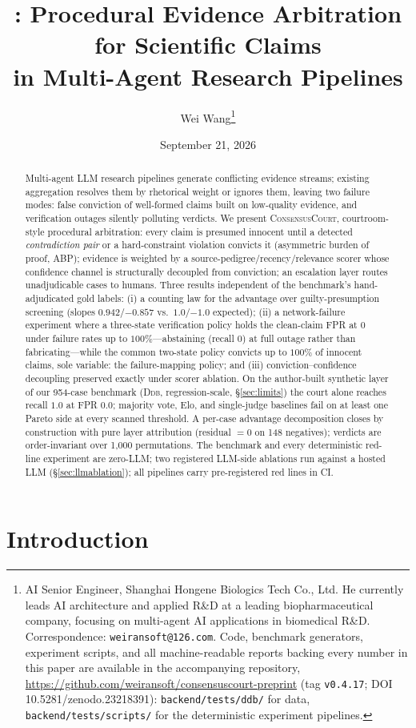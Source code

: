 \documentclass[11pt]{article}
\title{\court{}: Procedural Evidence Arbitration for Scientific Claims\\
in Multi-Agent Research Pipelines}
\author{Wei Wang\thanks{AI Senior Engineer, Shanghai Hongene Biologics Tech Co., Ltd.
He currently leads AI architecture and applied R\&D at a leading biopharmaceutical
company, focusing on multi-agent AI applications in biomedical R\&D.
Correspondence: \texttt{weiransoft@126.com}. Code, benchmark generators, experiment scripts, and
all machine-readable reports backing every number in this paper are available
in the accompanying repository,
\url{https://github.com/weiransoft/consensuscourt-preprint} (tag
\texttt{v0.4.17}; DOI 10.5281/zenodo.23218391): \texttt{backend/tests/ddb/}
for data, \texttt{backend/tests/scripts/} for the deterministic experiment
pipelines.}}
\date{September 21, 2026}
\newcommand{\court}{\textsc{ConsensusCourt}}
\newcommand{\ddb}{\textsc{Ddb}}
\begin{document}
\maketitle

\begin{abstract}
Multi-agent LLM research pipelines generate conflicting evidence streams;
existing aggregation resolves them by
rhetorical weight or ignores them, leaving two failure modes: false
conviction of well-formed claims built on low-quality evidence, and
verification outages silently polluting verdicts. We present
\court{}, courtroom-style procedural arbitration: every claim is presumed
innocent until a detected \emph{contradiction pair} or a hard-constraint
violation convicts it (asymmetric burden of proof, ABP); evidence is
weighted by a source-pedigree/recency/relevance scorer whose confidence
channel is structurally decoupled from conviction; an escalation layer
routes unadjudicable cases to humans. Three results independent of the
benchmark's hand-adjudicated gold labels: (i) a counting law for the
advantage over guilty-presumption screening (slopes
$0.942$/$-0.857$ vs.\ $1.0$/$-1.0$ expected); (ii) a network-failure
experiment where a three-state verification policy holds the clean-claim
FPR at $0$ under failure rates up to $100\%$—abstaining (recall $0$) at
full outage rather than fabricating—while the common two-state policy
convicts up to $100\%$ of innocent claims, sole variable: the
failure-mapping policy; and (iii) conviction--confidence decoupling
preserved exactly under scorer ablation. On the author-built synthetic
layer of our 954-case benchmark (\ddb{}, regression-scale,
\S\ref{sec:limits}) the court alone reaches recall $1.0$ at FPR $0.0$;
majority vote, Elo, and single-judge baselines fail on at least one Pareto
side at every scanned threshold. A per-case advantage decomposition closes
by construction with pure layer attribution (residual $=0$ on 148
negatives); verdicts are order-invariant over 1{,}000 permutations. The
benchmark and every deterministic red-line experiment are zero-LLM; two
registered LLM-side ablations run against a hosted LLM
(\S\ref{sec:llmablation}); all pipelines carry pre-registered red lines
in CI.
\end{abstract}

\section{Introduction}\label{sec:intro}
\end{document}
